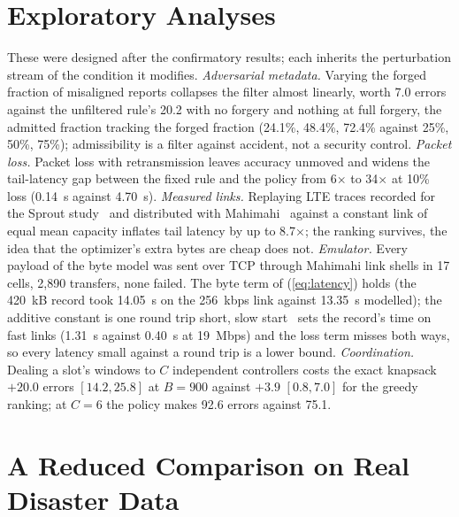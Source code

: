 \section{Exploratory Analyses}
\label{sec:exploratory}
These were designed after the confirmatory results; each inherits the perturbation stream of the condition it modifies. \emph{Adversarial metadata.} Varying the forged fraction of misaligned reports collapses the filter almost linearly, worth 7.0 errors against the unfiltered rule's 20.2 with no forgery and nothing at full forgery, the admitted fraction tracking the forged fraction (24.1\%, 48.4\%, 72.4\% against 25\%, 50\%, 75\%); admissibility is a filter against accident, not a security control. \emph{Packet loss.} Packet loss with retransmission leaves accuracy unmoved and widens the tail-latency gap between the fixed rule and the policy from 6$\times$ to 34$\times$ at 10\% loss (0.14~s against 4.70~s). \emph{Measured links.} Replaying LTE traces recorded for the Sprout study~\cite{sprout} and distributed with Mahimahi~\cite{mahimahi} against a constant link of equal mean capacity inflates tail latency by up to 8.7$\times$; the ranking survives, the idea that the optimizer's extra bytes are cheap does not. \emph{Emulator.} Every payload of the byte model was sent over TCP through Mahimahi link shells in 17 cells, 2,890 transfers, none failed. The byte term of (\ref{eq:latency}) holds (the 420~kB record took 14.05~s on the 256~kbps link against 13.35~s modelled); the additive constant is one round trip short, slow start~\cite{rfc5681} sets the record's time on fast links (1.31~s against 0.40~s at 19~Mbps) and the loss term misses both ways, so every latency small against a round trip is a lower bound. \emph{Coordination.} Dealing a slot's windows to $C$ independent controllers costs the exact knapsack $+20.0$ errors $[14.2, 25.8]$ at $B=900$ against $+3.9$ $[0.8, 7.0]$ for the greedy ranking; at $C=6$ the policy makes 92.6 errors against 75.1.

\section{A Reduced Comparison on Real Disaster Data}
\label{sec:real}
